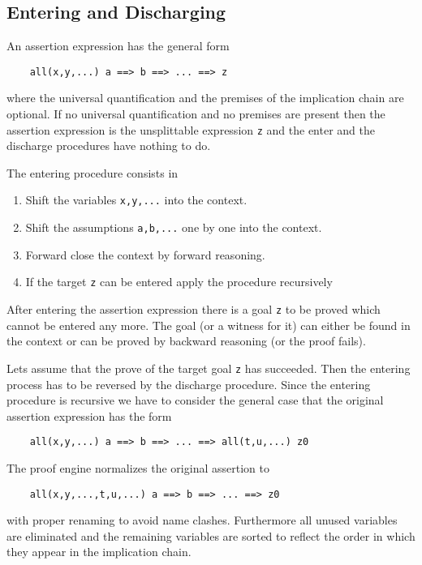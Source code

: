 \subsection{Entering and Discharging}

An assertion expression has the general form
\begin{lstlisting}
    all(x,y,...) a ==> b ==> ... ==> z
\end{lstlisting}
where the universal quantification and the premises of the implication chain
are optional. If no universal quantification and no premises are present then
the assertion expression is the unsplittable expression \lstinline!z! and the
enter and the discharge procedures have nothing to do.

The entering procedure consists in
\begin{enumerate}
\item Shift the variables \lstinline!x,y,...! into the context.

\item Shift the assumptions \lstinline!a,b,...! one by one into the context.

\item Forward close the context by forward reasoning.

\item If the target \lstinline!z! can be entered apply the procedure recursively
\end{enumerate}

After entering the assertion expression there is a goal \lstinline!z! to be
proved which cannot be entered any more. The goal (or a witness for it) can
either be found in the context or can be proved by backward reasoning (or the
proof fails).

Lets assume that the prove of the target goal \lstinline!z! has
succeeded. Then the entering process has to be reversed by the discharge
procedure. Since the entering procedure is recursive we have to consider the
general case that the original assertion expression has the form
%
\begin{lstlisting}
    all(x,y,...) a ==> b ==> ... ==> all(t,u,...) z0
\end{lstlisting}
%
The proof engine normalizes the original assertion to
%
\begin{lstlisting}
    all(x,y,...,t,u,...) a ==> b ==> ... ==> z0
\end{lstlisting}
%
with proper renaming to avoid name clashes. Furthermore all unused variables
are eliminated and the remaining variables are sorted to reflect the order in
which they appear in the implication chain.


